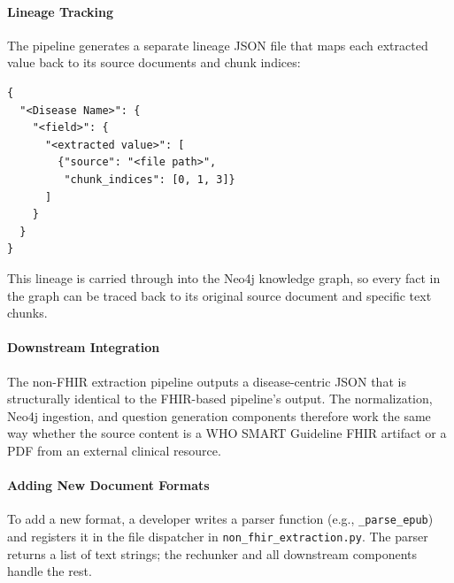 \paragraph{Lineage Tracking}
The pipeline generates a separate lineage JSON file that maps each extracted value back to its source documents and chunk indices:
\begin{verbatim}
{
  "<Disease Name>": {
    "<field>": {
      "<extracted value>": [
        {"source": "<file path>",
         "chunk_indices": [0, 1, 3]}
      ]
    }
  }
}
\end{verbatim}

This lineage is carried through into the Neo4j knowledge graph, so every fact in the graph can be traced back to its original source document and specific text chunks.

\paragraph{Downstream Integration}
The non-FHIR extraction pipeline outputs a disease-centric JSON that is structurally identical to the FHIR-based pipeline's output. The normalization, Neo4j ingestion, and question generation components therefore work the same way whether the source content is a WHO SMART Guideline FHIR artifact or a PDF from an external clinical resource.

\paragraph{Adding New Document Formats}
To add a new format, a developer writes a parser function (e.g., \texttt{\_parse\_epub}) and registers it in the file dispatcher in \texttt{non\_fhir\_extraction.py}. The parser returns a list of text strings; the rechunker and all downstream components handle the rest.
